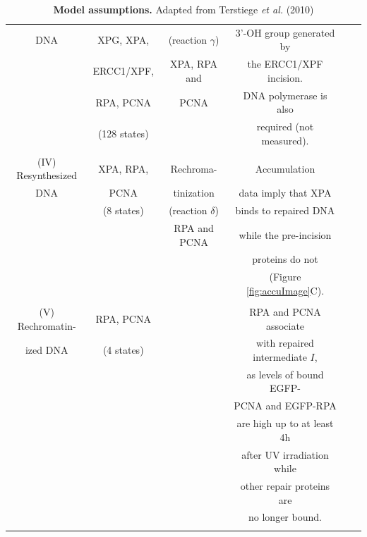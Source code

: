 \begin{table}[t!]
{\begin{tabular}{cccccc}
			DNA& XPG, XPA,& (reaction $\gamma$)&3'-OH group generated by&\cite{Winkler2001}\\
			& ERCC1/XPF,&XPA, RPA and&  the ERCC1/XPF incision.&\\
			&RPA, PCNA& PCNA& DNA polymerase is also&\\
			&(128 states)&& required (not measured).	&\\
			&&&& \\   \hline
			\rule{0pt}{3ex}
			(IV) Resynthesized&XPA, RPA,&Rechroma-&Accumulation&\cite{Moser2005}\\
			DNA&	 PCNA& tinization& data imply that XPA&  \cite{Shivji:1995:Biochemistry:7711023}\\
			&(8 states)&(reaction $\delta$)& binds  to repaired DNA &\cite{Luijsterburg2010}\\
			&&RPA and PCNA&while the pre-incision &\\
			&&&	  proteins do not &\\
			&&& (Figure \ref{fig:accuImage}C).&\\
			&&&& \\ \hline
			\rule{0pt}{3ex}
			(V) Rechromatin- &RPA, PCNA &&RPA and PCNA associate&\cite{Riedl2003}\\
			ized DNA &(4 states)	&&with repaired intermediate $I$,&\cite{Luijsterburg2010}\\
			&&&as levels of bound EGFP-&\\
			&&&PCNA and EGFP-RPA&\\ 
			&&& are  high up to at least 4h&\\
			&&& after UV irradiation while&\\
			&&& other repair proteins are&\\   
			&&& no longer bound.&\\   &&&& \\ \hline
		\end{tabular}}
		\caption{\textbf{Model assumptions.} Adapted from Terstiege \textit{et al.} (2010) \cite{Terstiege2010}}\label{tab:modelassumptions}
	\end{table}
	\newpage
	\cleardoublepage  
	 
